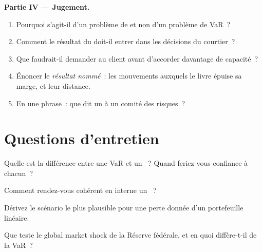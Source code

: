 \begin{problem}
\medskip\noindent\textbf{Partie IV --- Jugement.}
\begin{enumerate}[resume]
\item Pourquoi s'agit-il d'un problème de  et non d'un problème de VaR~?
\item Comment le résultat du  doit-il entrer dans les décisions du courtier~?
\item Que faudrait-il demander au client avant d'accorder davantage de capacité~?
\item Énoncer le \emph{résultat nommé}~: les mouvements auxquels le livre épuise sa marge, et
leur distance.
\item En une phrase~: que dit un  à un comité des risques~?
\end{enumerate}
\end{problem}

\section{Questions d'entretien}

\begin{interviewq}\label{iq:rc:stress-testing-and-scenarios:1}
Quelle est la différence entre une VaR et un ~? Quand feriez-vous confiance à chacun~?
\end{interviewq}

\begin{interviewq}\label{iq:rc:stress-testing-and-scenarios:2}
Comment rendez-vous cohérent en interne un ~?
\end{interviewq}

\begin{interviewq}\label{iq:rc:stress-testing-and-scenarios:3}
Dérivez le scénario le plus plausible pour une perte donnée d'un portefeuille linéaire.
\end{interviewq}

\begin{interviewq}\label{iq:rc:stress-testing-and-scenarios:4}
Que teste le global market shock de la Réserve fédérale, et en quoi diffère-t-il de la VaR~?
\end{interviewq}

